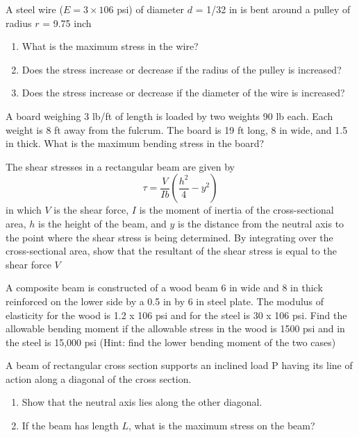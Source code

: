 \documentclass[
10pt,
a4paper,
openany,
svgnames,
]{book} %
\newcommand{\exercise}{%
\item\label{lab:\arabic{chapter}.\arabic{exercisesi}}  %
}
\begin{document}
\begin{exercises}

  \exercise A steel wire ($E = 3 \times 106$ psi) of diameter $d$ = 1/32 in is bent around a pulley of radius $r$ = 9.75 inch
  \begin{enumerate}

  \item What is the maximum stress in the wire?
  \item Does the stress increase or decrease if the radius of the pulley is increased?
  \item Does the stress increase or decrease if the diameter of the wire is increased?

  \end{enumerate}

  \exercise A board weighing 3 lb/ft of length is loaded by two weights 90 lb each. Each weight is 8 ft away from the fulcrum. The board is 19 ft long, 8 in wide, and 1.5 in thick. What is the maximum bending stress in the board?

  \exercise The shear stresses in a rectangular beam are given by
  \[ \tau = \frac{V}{Ib} \left( \frac{h^2}{4} - y^2 \right) \]	
  in which $V$ is the shear force, $I$ is the moment of inertia of the cross-sectional area, $h$ is the height of the beam, and $y$ is the distance from the neutral axis to the point where the shear stress is being determined. By integrating over the cross-sectional area, show that the resultant of the shear stress is equal to the shear force $V$
  
  \exercise A composite beam is constructed of a wood beam 6 in wide and 8 in thick reinforced on the lower side by a 0.5 in by 6 in steel plate. The modulus of elasticity for the wood is 1.2 x 106 psi and for the steel is 30 x 106 psi. Find the allowable bending moment if the allowable stress in the wood is 1500 psi and in the steel is 15,000 psi (Hint: find the lower bending moment of the two cases)

  \exercise A beam of rectangular cross section supports an inclined load P having its line of action along a diagonal of the cross section.
  \begin{enumerate}
    
  \item Show that the neutral axis lies along the other diagonal.
  \item If the beam has length $L$, what is the maximum stress on the beam?

  \end{enumerate}
  

\end{exercises}
\end{document}
